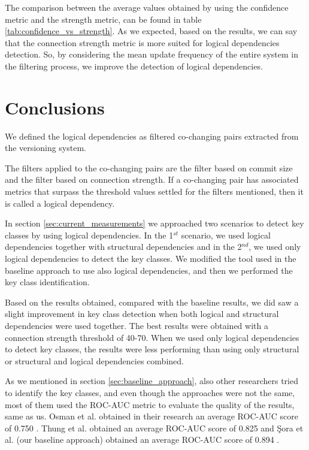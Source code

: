 \documentclass[runningheads]{comsis2}
\begin{document}
The comparison between the average values obtained by using the confidence metric and the strength metric, can be found in table \ref{tab:confidence_vs_strength}.
As we expected, based on the results, we can say that the connection strength metric is more suited for logical dependencies detection. So, by considering the mean update frequency of the entire system in the filtering process, we improve the detection of logical dependencies.



\section{Conclusions}
\label{sec:conclusion}


We defined the logical dependencies as filtered co-changing pairs extracted from the versioning system. 

The filters applied to the co-changing pairs are the filter based on commit size and the filter based on connection strength. If a co-changing pair has associated metrics that surpass the threshold values settled for the filters mentioned, then it is called a logical dependency.

In section \ref{sec:current_measurements} we approached two scenarios to detect key classes by using logical dependencies. In the 1$^{st}$ scenario, we used logical dependencies together with structural dependencies and in the 2$^{nd}$, we used only logical dependencies to detect the key classes. We modified the tool used in the baseline approach to use also logical dependencies, and then we performed the key class identification. 

Based on the results obtained, compared with the baseline results, we did saw a slight improvement in key class detection when both logical and structural dependencies were used together. The best results were obtained with a connection strength threshold of 40-70. When we used only logical dependencies to detect key classes, the results were less performing than using only structural or structural and logical dependencies combined.

As we mentioned in section \ref{sec:baseline_approach}, also other researchers tried to identify the key classes, and even though the approaches were not the same, most of them used the ROC-AUC metric to evaluate the quality of the results, same as us. 
Osman et al. obtained in their research an average ROC-AUC score of 0.750 \cite{6676885}. Thung et al. obtained an average ROC-AUC score of 0.825 \cite{rocclasification}  and Şora et al. (our baseline approach) obtained an average ROC-AUC score of 0.894 \cite{Finding-key-classes}.
\end{document}
